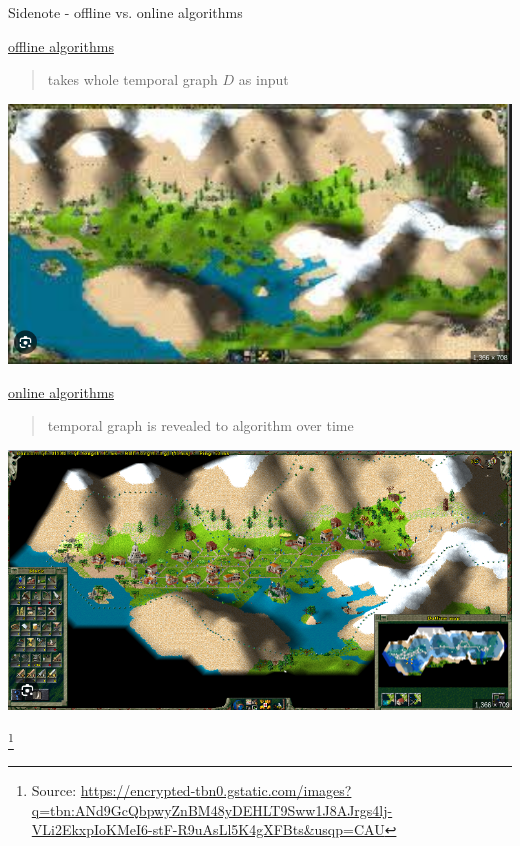 \documentclass{beamer}
\newcommand{\sourcefootnote}[1]{\let\thefootnote\relax\footnote{{\tiny Source: \url{#1}}}}
\begin{document}
\begin{frame}{Sidenote - offline vs. online algorithms}
  \begin{minipage}{0.45\textwidth}
    \underline{offline algorithms}
    \begin{quote}
      takes whole temporal graph $D$ as input\\
    \end{quote}
    \includegraphics[width=\linewidth]{media/offline_algorithm.png}
  \end{minipage} \hfill 
  \begin{minipage}{0.45\textwidth}
    \underline{online algorithms}
    \begin{quote}
    temporal graph is revealed to algorithm over time
    \end{quote}
    \includegraphics[width=\linewidth]{media/online_algo.png}
  \end{minipage}
  \sourcefootnote{https://encrypted-tbn0.gstatic.com/images?q=tbn:ANd9GcQbpwyZnBM48yDEHLT9Sww1J8AJrgs4lj-VLi2EkxpIoKMeI6-stF-R9uAsLl5K4gXFBts&usqp=CAU}
\end{frame}
\end{document}
